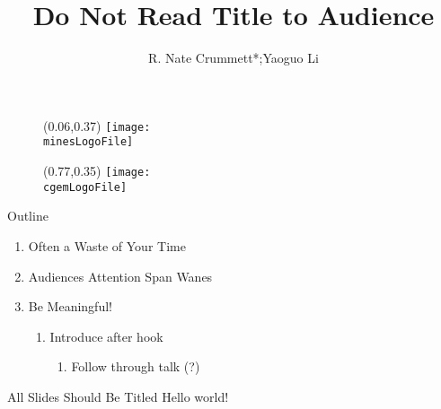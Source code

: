 \documentclass[light]{cgem-presentation}
\title{Do Not Read Title to Audience}
\author{R. Nate Crummett*;Yaoguo Li}
\begin{document}
  \begin{frame}[plain]
    \begin{figure}
      \begin{textblock*}{2.05cm}(0.06\paperwidth,0.37\paperheight)
        \texttt{[image: \\minesLogoFile]}
      \end{textblock*}
    \end{figure}
    \begin{figure}
      \begin{textblock*}{2.85cm}(0.77\paperwidth,0.35\paperheight)
        \texttt{[image: \\cgemLogoFile]}
      \end{textblock*}
    \end{figure}
    \maketitle{1cm}{1.2cm}{2mm}{-5mm}
  \end{frame}

  \begin{frame}{Outline}
    \begin{enumerate}
      \item Often a Waste of Your Time
      \item Audiences Attention Span Wanes
      \item Be Meaningful! \\[1mm]
      \begin{enumerate}
        \item Introduce after hook \\[2mm]
        \begin{enumerate}
          \item Follow through talk (?)
        \end{enumerate}
      \end{enumerate}
    \end{enumerate}
  \end{frame}
 
  \begin{frame}{All Slides Should Be Titled}
    \LARGE 
    Hello world!
  \end{frame}
\end{document}
